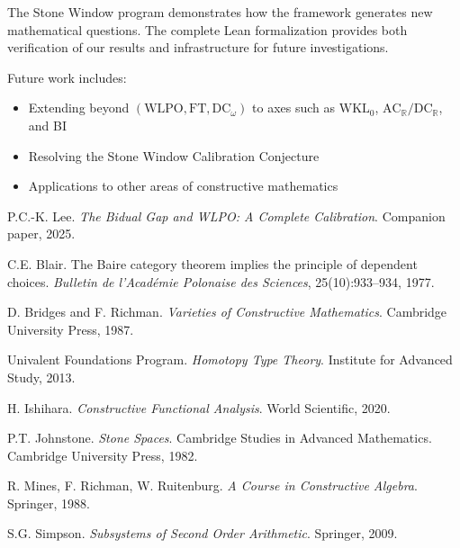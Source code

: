 \documentclass[11pt]{article}
\newcommand{\WLPO}{\mathrm{WLPO}}
\newcommand{\FT}{\mathrm{FT}}
\newcommand{\DCw}{\mathrm{DC}_\omega}
\newcommand{\ACR}{\mathrm{AC}_{\mathbb{R}}}
\newcommand{\DCR}{\mathrm{DC}_{\mathbb{R}}}
\newcommand{\WKLz}{\mathrm{WKL}_0}
\begin{document}
The Stone Window program demonstrates how the framework generates new mathematical questions. The complete Lean formalization provides both verification of our results and infrastructure for future investigations.

Future work includes:
\begin{itemize}
\item Extending beyond $(\WLPO,\FT,\DCw)$ to axes such as $\WKLz$, $\ACR/\DCR$, and BI
\item Resolving the Stone Window Calibration Conjecture
\item Applications to other areas of constructive mathematics
\end{itemize}

\begin{thebibliography}{10}
 P.C.-K. Lee. \emph{The Bidual Gap and WLPO: A Complete Calibration}. Companion paper, 2025.

 C.E. Blair. The Baire category theorem implies the principle of dependent choices. \emph{Bulletin de l'Académie Polonaise des Sciences}, 25(10):933--934, 1977.

 D. Bridges and F. Richman. \emph{Varieties of Constructive Mathematics}. Cambridge University Press, 1987.

 Univalent Foundations Program. \emph{Homotopy Type Theory}. Institute for Advanced Study, 2013.

 H. Ishihara. \emph{Constructive Functional Analysis}. World Scientific, 2020.

 P.T. Johnstone. \emph{Stone Spaces}. Cambridge Studies in Advanced Mathematics. Cambridge University Press, 1982.

 R. Mines, F. Richman, W. Ruitenburg. \emph{A Course in Constructive Algebra}. Springer, 1988.

 S.G. Simpson. \emph{Subsystems of Second Order Arithmetic}. Springer, 2009.

\end{thebibliography}
\end{document}
